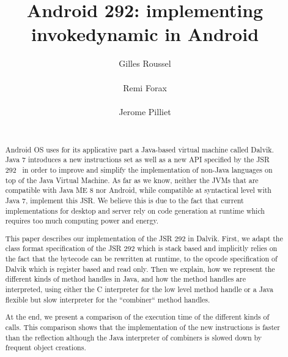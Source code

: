 \documentclass{sig-alternate}
\def \Jsr{JSR\xspace}
\def \JSR{\Jsr 292\xspace}
\def \ANDROID{Android\xspace}
\begin{document}
\title{Android 292: implementing invokedynamic in Android}

\author{
  \alignauthor Gilles Roussel\\
    \\
  \alignauthor Remi Forax\\
    \\
  \alignauthor Jerome Pilliet\\
    \\
}


\maketitle

\begin{abstract}
\ANDROID OS uses for its applicative part a Java-based virtual machine called Dalvik.
Java 7 introduces a new instructions set as well as a new API  specified by the \JSR~\cite{jcp-jsr-292}
in order to improve and simplify the implementation of non-Java languages on top of the Java Virtual Machine.
As far as we know, neither the JVMs that are compatible with Java ME 8 nor
\ANDROID, while compatible at syntactical level with Java 7, implement this \Jsr.
We believe this is due to the fact that current implementations for desktop and server rely
on code generation at runtime which requires too much computing power and energy.

This paper describes our implementation of the \JSR in Dalvik.
First, we adapt the class format specification of the \JSR which is stack based and implicitly relies on the fact that the bytecode
can be rewritten at runtime, to the opcode specification of Dalvik which is register based and read only. 
Then we explain, how we represent the different kinds of method handles in Java, and how the method handles are interpreted,
using either the C interpreter for the low level method handle or a Java flexible but slow interpreter for the ``combiner`` method handles.

At the end, we present a comparison of the execution time of the different kinds of calls.
This comparison shows that the implementation of the new instructions is faster than the reflection
although the Java interpreter of combiners is slowed down by frequent object creations.
\end{abstract}
\end{document}
